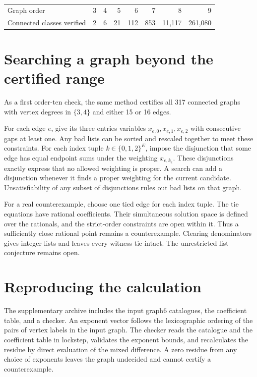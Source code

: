 \documentclass[10pt]{article}
\begin{document}
\begin{center}
\begin{tabular}{lrrrrrrr}
\hline
Graph order & 3 & 4 & 5 & 6 & 7 & 8 & 9 \\
Connected classes verified & 2 & 6 & 21 & 112 & 853 & 11,117 & 261,080 \\
\hline
\end{tabular}
\end{center}

\newpage
\section*{Searching a graph beyond the certified range}
As a first order-ten check, the same method certifies all 317 connected
graphs with vertex degrees in $\{3,4\}$ and either 15 or 16 edges.

For each edge $e$, give its three entries variables $x_{e,0},x_{e,1},x_{e,2}$
with consecutive gaps at least one. Any bad lists can be sorted and rescaled
together to meet these constraints. For each index tuple $k\in\{0,1,2\}^E$,
impose the disjunction that some edge has equal endpoint sums under the
weighting $x_{e,k_e}$. These disjunctions exactly express that no allowed
weighting is proper. A search can add a disjunction whenever it finds a
proper weighting for the current candidate. Unsatisfiability of any subset
of disjunctions rules out bad lists on that graph.

For a real counterexample, choose one tied edge for each index tuple. The
tie equations have rational coefficients. Their simultaneous solution
space is defined over the rationals, and the strict-order constraints are
open within it. Thus a sufficiently close rational point remains a
counterexample. Clearing denominators gives integer lists and leaves
every witness tie intact. The unrestricted list conjecture remains open.

\section*{Reproducing the calculation}
The supplementary archive includes the input graph6 catalogues, the
coefficient table, and a checker. An exponent vector follows the
lexicographic ordering of the pairs of vertex labels in the input graph.
The checker reads the catalogue and the coefficient table in lockstep,
validates the exponent bounds, and recalculates the residue by direct
evaluation of the mixed difference. A zero residue from any choice of
exponents leaves the graph undecided and cannot certify a counterexample.
\end{document}
